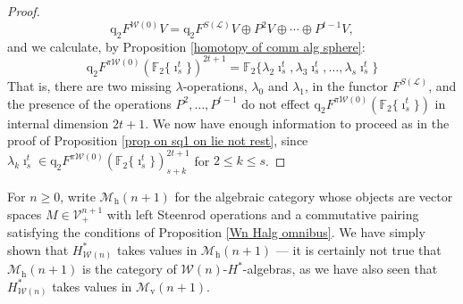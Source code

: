\documentclass[11pt]{amsart} \renewcommand{\baselinestretch}{1.2}
\theoremstyle{plain}
\numberwithin{equation}{section} %
\theoremstyle{plain}
\numberwithin{equation}{chapter} %
\newcommand{\scrL}{\mathscr{L}}
\newcommand{\calV}{\mathcal{V}}
\newcommand{\calw}{\mathcal{W}}
\newcommand{\calMv}{\mathcal{M}\dver}
\newcommand{\calMh}{\mathcal{M}\dhor}
\newcommand{\LieOperad}{{\scrL}}
\newcommand{\vect}[2]{\calV^{#1}_{#2}}
\newcommand{\PA}[1]{\pi#1}
\newcommand{\quadgrad}[1]{\mathrm{q}_{#1}}
\newcommand{\F}{\mathbb{F}}
\newcommand{\Ftwo}{\F_2}
\newcommand{\dver}{_\mathrm{v}}
\newcommand{\dhor}{_\mathrm{h}}
\begin{document}
\begin{Cohomology Operations for W and U}
\begin{proof}
\[\quadgrad{2}F^{\calw(0)}V=\quadgrad{2}F^{S(\LieOperad)}V\oplus P^2V\oplus\cdots \oplus P^{t-1}V,\]
and
we calculate, by Proposition \ref{homotopy of comm alg sphere}:
\[\quadgrad{2}F^{\PA{\calw(0)}}(\Ftwo\{\imath^t_s\})^{2t+1}=\Ftwo\{\lambda_2\imath^t_s,\lambda_3\imath^t_s,\ldots,\lambda_s\imath^t_s\}\]
 That is, there are two missing $\lambda$-operations, $\lambda_0$ and $\lambda_1$, in the functor $F^{S(\LieOperad)}$, and the presence of the operations $P^2,\ldots,P^{t-1}$ do not effect $\quadgrad{2}F^{\PA{\calw(0)}}(\Ftwo\{\imath^t_s\})$ in internal dimension $2t+1$. We now have enough information to proceed as in the proof of Proposition \ref{prop on sq1 on lie not rest}, since $\lambda_k\imath^t_s\in \quadgrad{2}F^{\PA{\calw(0)}}(\Ftwo\{\imath^t_s\})^{2t+1}_{s+k}$ for $2\leq k\leq s$.
\end{proof}



For $n\geq0$, write $\calMh(n+1)$ for the algebraic category whose objects are vector spaces $M\in\vect{n+1}{+}$ with left Steenrod operations and a commutative pairing satisfying the conditions of Proposition \ref{Wn Halg omnibus}. We have simply shown that $H^*_{\calw(n)}$ takes values in $\calMh(n+1)$ --- it is certainly not true that $\calMh(n+1)$ is the category of $\calw(n)$-$H^*$-algebras, as we have also seen that $H^*_{\calw(n)}$ takes values in $\calMv(n+1)$.


\end{Cohomology Operations for W and U}
\end{document}
